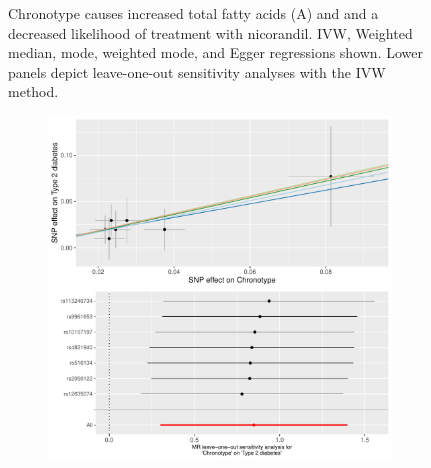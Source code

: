 \documentclass{article}
\begin{document}
\begin{figure}[htbp]
\begin{subfigure}[b]{0.4\textwidth}
         \caption{}
         \label{nicorandil}
     \end{subfigure}
        \caption{Chronotype causes increased total fatty acids (A) and and a decreased likelihood of treatment with nicorandil. IVW, Weighted median, mode, weighted mode, and Egger regressions shown. Lower panels depict leave-one-out sensitivity analyses with the IVW method.}
        \label{nicorandil}
\end{figure}


\begin{figure}[htbp]
     \centering
     \begin{subfigure}[b]{0.4\textwidth}
         \centering
         \includegraphics[width=\textwidth]{Figs/Analysis2/Chronotype_vs_Type_2_diabetes.Plots.pdf}
         \caption{}
         \label{t2dm}
     \end{subfigure}
     \begin{subfigure}[b]{0.4\textwidth}
         \centering

\end{subfigure}
\end{figure}
\end{document}
